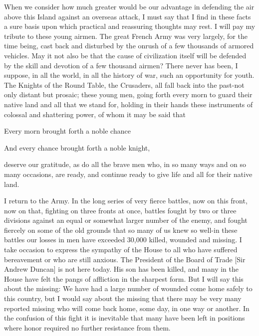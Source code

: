 \documentclass[a4paper]{amsbook}
\begin{document}
When we consider how much greater would be our advantage in defending the air above this Island against an overseas attack, I must say that I find in these facts a sure basis upon which practical and reassuring thoughts may rest. I will pay my tribute to these young airmen. The great French Army was very largely, for the time being, cast back and disturbed by the onrush of a few thousands of armored vehicles. May it not also be that the cause of civilization itself will be defended by the skill and devotion of a few thousand airmen? There never has been, I suppose, in all the world, in all the history of war, such an opportunity for youth. The Knights of the Round Table, the Crusaders, all fall back into the past-not only distant but prosaic; these young men, going forth every morn to guard their native land and all that we stand for, holding in their hands these instruments of colossal and shattering power, of whom it may be said that

Every morn brought forth a noble chance

And every chance brought forth a noble knight,

deserve our gratitude, as do all the brave men who, in so many ways and on so many occasions, are ready, and continue ready to give life and all for their native land.

I return to the Army. In the long series of very fierce battles, now on this front, now on that, fighting on three fronts at once, battles fought by two or three divisions against an equal or somewhat larger number of the enemy, and fought fiercely on some of the old grounds that so many of us knew so well-in these battles our losses in men have exceeded 30,000 killed, wounded and missing. I take occasion to express the sympathy of the House to all who have suffered bereavement or who are still anxious. The President of the Board of Trade [Sir Andrew Duncan] is not here today. His son has been killed, and many in the House have felt the pangs of affliction in the sharpest form. But I will say this about the missing: We have had a large number of wounded come home safely to this country, but I would say about the missing that there may be very many reported missing who will come back home, some day, in one way or another. In the confusion of this fight it is inevitable that many have been left in positions where honor required no further resistance from them.
\end{document}

